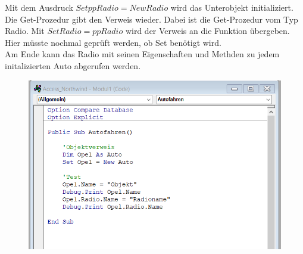 Mit dem Ausdruck $Set ppRadio = New Radio$ wird das Unterobjekt initializiert. Die Get-Prozedur gibt den Verweis wieder. Dabei ist die Get-Prozedur vom Typ Radio. Mit $Set Radio = ppRadio$ wird der Verweis an die Funktion übergeben. Hier müsste nochmal geprüft werden, ob Set benötigt wird.\\
Am Ende kann das Radio mit seinen Eigenschaften und Methden zu jedem initalizierten Auto abgerufen werden.
\begin{figure}[H]
	\centering
	\includegraphics[scale = 0.3]{attachment/chapter_2/Scc041}
	\caption{}
	\label{fig:Scc041}
\end{figure} 
